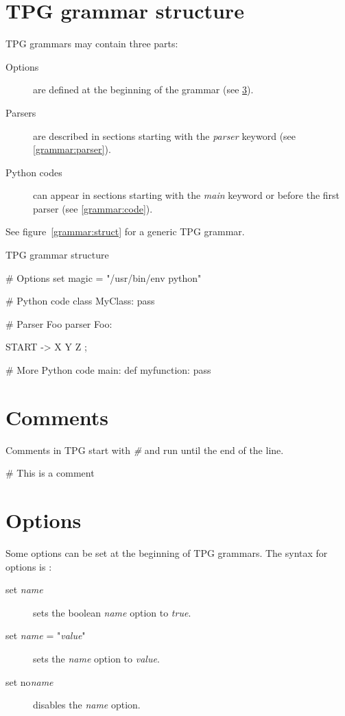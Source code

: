 \section{TPG grammar structure}

TPG grammars may contain three parts:

\begin{description}
	\item [Options]
		are defined at the beginning of the grammar (see \ref{grammar:options}).
	\item [Parsers]
		are described in sections starting with the \emph{parser} keyword (see \ref{grammar:parser}).
	\item [Python codes]
		can appear in sections starting with the \emph{main} keyword or before the first parser (see \ref{grammar:code}).
\end{description}

See figure~\ref{grammar:struct} for a generic TPG grammar.

\begin{code}
\caption{TPG grammar structure} \label{grammar:struct}
\begin{verbatimtab}[4]
# Options
set magic = "/usr/bin/env python"

# Python code
{{
	class MyClass:
		pass
}}

# Parser Foo
parser Foo:

	START -> X Y Z ;

# More Python code
main:
{{
	def myfunction:
		pass
}}
\end{verbatimtab}
\end{code}

\section{Comments}

Comments in TPG start with \emph{\#} and run until the end of the line.

\begin{verbatimtab}[4]
	# This is a comment
\end{verbatimtab}

\section{Options}
\label{grammar:options}

Some options can be set at the beginning of TPG grammars.
The syntax for options is :

\begin{description}
	\item [set \emph{name}] sets the boolean \emph{name} option to \emph{true}.
	\item [set \emph{name} = "\emph{value}"] sets the \emph{name} option to \emph{value}.
	\item [set no\emph{name}] disables the \emph{name} option.
\end{description}

